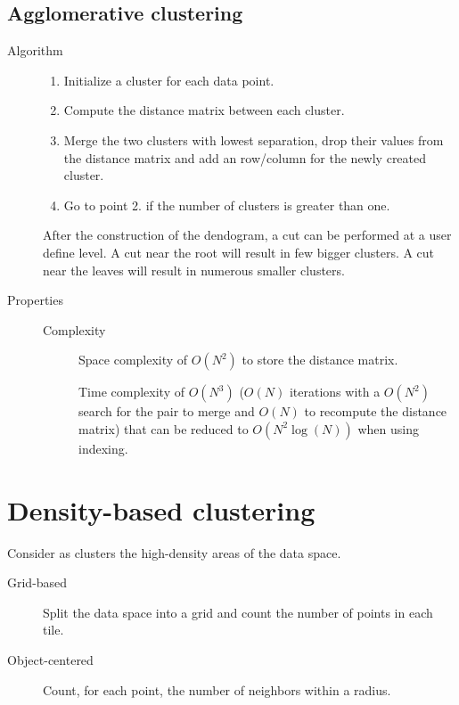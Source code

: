 \subsection{Agglomerative clustering}

\begin{description}
    \item[Algorithm]  \phantom{}
        \begin{enumerate}
            \item Initialize a cluster for each data point.
            \item Compute the distance matrix between each cluster.
            \item Merge the two clusters with lowest separation, 
                drop their values from the distance matrix and add an row/column for the newly created cluster.
            \item Go to point 2. if the number of clusters is greater than one.
        \end{enumerate}

        After the construction of the dendogram, a cut  can be performed at a user define level.
        A cut near the root will result in few bigger clusters.
        A cut near the leaves will result in numerous smaller clusters.
        

    \item[Properties] \phantom{}
        \begin{description}
            \item[Complexity] 
                Space complexity of $O(N^2)$ to store the distance matrix.
                
                Time complexity of $O(N^3)$ ($O(N)$ iterations with a $O(N^2)$ search for the pair to merge and $O(N)$ to recompute the distance matrix) 
                that can be reduced to $O(N^2\log(N))$ when using indexing.
        \end{description}
\end{description}



\section{Density-based clustering}

Consider as clusters the high-density areas of the data space.

\begin{description}
    \item[Grid-based] 
        Split the data space into a grid and count the number of points in each tile.

    \item[Object-centered] 
        Count, for each point, the number of neighbors within a radius.
\end{description}


